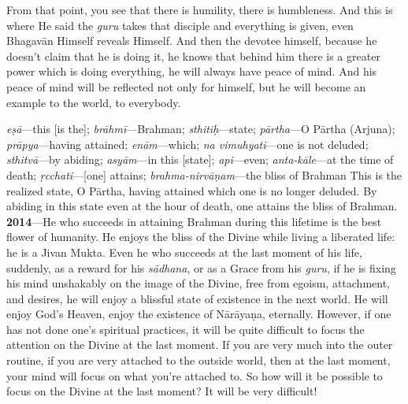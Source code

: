 From that point, you see that there is humility, there is humbleness. And this is where He said the \textit{guru} takes that disciple and everything is given, even Bhagavān Himself reveals Himself. And then the devotee himself, because he doesn’t claim that he is doing it, he knows that behind him there is a greater power which is doing everything, he will always have peace of mind. And his peace of mind will be reflected not only for himself, but he will become an example to the world, to everybody.

{%
  \textit{eṣā}---this [is the]; 
  \textit{brāhmī}---Brahman; 
  \textit{sthitiḥ}---state; 
  \textit{pārtha}---O Pārtha (Arjuna); 
  \textit{prāpya}---having attained; 
  \textit{enām}---which; 
  \textit{na vimuhyati}---one is not deluded; 
  \textit{sthitvā}---by abiding; 
  \textit{asyām}---in this [state]; 
  \textit{api}---even; 
  \textit{anta-kāle}---at the time of death; 
  \textit{ṛcchati}---[one] attains; 
  \textit{brahma-nirvāṇam}---the bliss of Brahman
}
{%
  This is the realized state, O Pārtha, having attained which one is no longer deluded. By abiding in this state even at the hour of death, one attains the bliss of Brahman.
}
\textbf{2014}---He who succeeds in attaining Brahman during this lifetime is the best flower of humanity. He enjoys the bliss of the Divine while living a liberated life: he is a Jivan Mukta. Even he who succeeds at the last moment of his life, suddenly, as a reward for his \textit{sādhana}, or as a Grace from his \textit{guru}, if he is fixing his mind unshakably on the image of the Divine, free from egoism, attachment, and desires, he will enjoy a blissful state of existence in the next world. He will enjoy God’s Heaven, enjoy the existence of Nārāyaṇa, eternally. However, if one has not done one’s spiritual practices, it will be quite difficult to focus the attention on the Divine at the last moment. If you are very much into the outer routine, if you are very attached to the outside world, then at the last moment, your mind will focus on what you’re attached to. So how will it be possible to focus on the Divine at the last moment? It will be very difficult!

